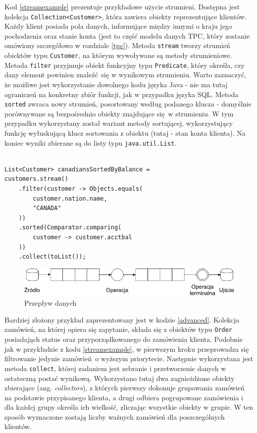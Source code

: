 \documentclass[12pt,twoside,openright]{extarticle}
\begin{document}
    Kod \ref{streamexample} prezentuje przykładowe użycie strumieni. Dostępna jest kolekcja \newline \texttt{Collection<Customer>}, która zawiera obiekty reprezentujące klientów. Każdy klient posiada pola danych, informujące między innymi o kraju jego pochodzenia oraz stanie konta (jest to część modelu danych TPC, który zostanie omówiony szczegółowo w rozdziale \ref{tpc}). Metoda \texttt{stream} tworzy strumień obiektów typu \texttt{Customer}, na którym wywoływane są metody strumieniowe. Metoda \texttt{filter} przyjmuje obiekt funkcyjny typu \texttt{Predicate}, który określa, czy dany element powinien znaleźć się w wynikowym strumieniu. Warto zaznaczyć, że możliwe jest wykorzystanie dowolnego kodu języka Java - nie ma tutaj ograniczeń na konkretny zbiór funkcji, jak w przypadku języka SQL. Metoda \texttt{sorted} zwraca nowy strumień, posortowany według podanego klucza - domyślnie porównywane są bezpośrednio obiekty znajdujące się w strumieniu. W tym przypadku wykorzystany został wariant metody sortującej, wykorzystujący funkcję wyłuskującą klucz sortowania z obiektu (tutaj - stan konta klienta). Na koniec wyniki zbierane są do listy typu \texttt{java.util.List}. 

\begin{lstlisting}[label=streamexample, caption=Przykładowe wykorzystanie Stream API]

List<Customer> canadiansSortedByBalance = 
customers.stream()
    .filter(customer -> Objects.equals(
        customer.nation.name,
        "CANADA"
    ))
    .sorted(Comparator.comparing(
        customer -> customer.acctbal
    ))
    .collect(toList());

\end{lstlisting}

\begin{figure}
\centering
\includegraphics[width=14cm]{flow.png}
\caption{Przepływ danych}
\label{fig:flow}
\end{figure}

    Bardziej złożony przykład zaprezentowany jest w kodzie \ref{advanced}. Kolekcja zamówień, na której opiera się zapytanie, składa się z obiektów typu \texttt{Order} posiadająch status oraz przyporządkowanego do zamówienia klienta. Podobnie jak w przykładzie z kodu \ref{streamexample}, w pierwszym kroku przeprowadza się filtrowanie jedynie zamówień~o wyższym priorytecie. Następnie wykorzystana jest metoda \texttt{collect}, której zadaniem jest zebranie i przetworzenie danych w ostateczną postać wynikową. Wykorzystano tutaj dwa zagnieżdżone obiekty zbierające (ang. \textit{collectors}), z których pierwszy dokonuje grupowania zamówień na podstawie przypisanego klienta, a drugi odbiera pogrupowane zamówienia i dla każdej grupy określa ich wielkość, zliczając wszystkie obiekty w grupie. W ten sposób wyznaczone zostają liczby ważnych zamówień dla poszczególnych klientów.
\end{document}
